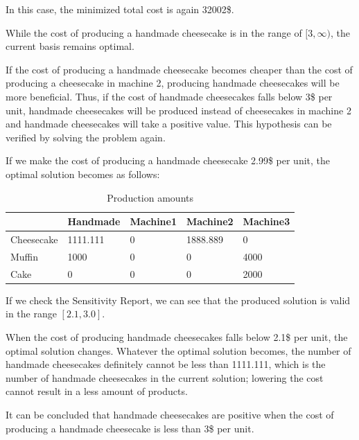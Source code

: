 \documentclass{article}
\begin{document}
In this case, the minimized total cost is again 32002\$.

While the cost of producing a handmade cheesecake is in the range of $[3, \infty)$, the current basis remains optimal.

If the cost of producing a handmade cheesecake becomes cheaper than the cost of producing a cheesecake in machine 2, producing handmade cheesecakes will be more beneficial.
Thus, if the cost of handmade cheesecakes falls below 3\$ per unit, handmade cheesecakes will be produced instead of cheesecakes in machine 2 and handmade cheesecakes will take a positive value.
This hypothesis can be verified by solving the problem again.

If we make the cost of producing a handmade cheesecake 2.99\$ per unit, the optimal solution becomes as follows:
\begin{table}[H]
    \centering
    \caption{Production amounts}
    \begin{tabular}{|l|l|l|l|l|}
    \hline
               & Handmade & Machine1 & Machine2 & Machine3 \\ \hline
    Cheesecake & 1111.111        & 0        & 1888.889     & 0        \\ \hline
    Muffin     & 1000     & 0        & 0        & 4000     \\ \hline
    Cake       & 0        & 0        & 0        & 2000     \\ \hline
    \end{tabular}
\end{table}

If we check the Sensitivity Report, we can see that the produced solution is valid in the range $[2.1, 3.0]$.

\begin{table}[H]
    \centering
    \caption{Sensitivity Report}
\end{table}%
When the cost of producing handmade cheesecakes falls below 2.1\$ per unit, the optimal solution changes.
Whatever the optimal solution becomes, the number of handmade cheesecakes definitely cannot be less than 1111.111, which is the number of handmade cheesecakes in the current solution; lowering the cost cannot result in a less amount of products.

It can be concluded that handmade cheesecakes are positive when the cost of producing a handmade cheesecake is less than 3\$ per unit.
\end{document}
